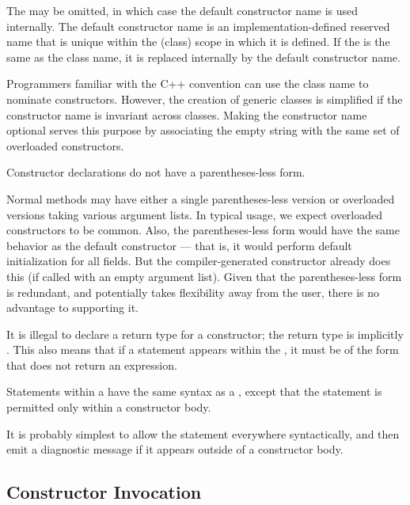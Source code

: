 The  may be omitted, in which case the default
constructor name is used internally.  The default constructor name is an
implementation-defined reserved name that is unique within the (class) scope in
which it is defined.  If the  is
the same as the class name, it is replaced internally by the default constructor name.
\begin{rationale}
Programmers familiar with the C++ convention can use the class name to nominate
constructors.  However, the creation of generic classes is simplified if the
constructor name is invariant across classes.  Making the constructor name
optional serves this purpose by associating the empty string with the same set
of overloaded constructors.
\end{rationale}

Constructor declarations do not have a parentheses-less form.
\begin{rationale}
Normal methods may have either a single parentheses-less version or overloaded
versions taking various argument lists.  In typical usage, we expect overloaded
constructors to be common.  Also, the parentheses-less form would have the same
behavior as the default constructor --- that is, it would perform default
initialization for all fields.  But the compiler-generated constructor already
does this (if called with an empty argument list).  Given that the
parentheses-less form is redundant, and potentially takes flexibility away from
the user, there is no advantage to supporting it.
\end{rationale}

It is illegal to declare a return type for a constructor; the return type is
implicitly .  This also means that if a  statement
appears within the , it must be of the form that does not
return an expression.

Statements within a  have the same syntax as
a , except that the  statement is permitted only
within a constructor body.

\begin{note}
It is probably simplest to allow the  statement everywhere
syntactically, and then emit a diagnostic message if it appears outside of a
constructor body.
\end{note}

\subsection{Constructor Invocation}
\label{Constructor_Invocation}

